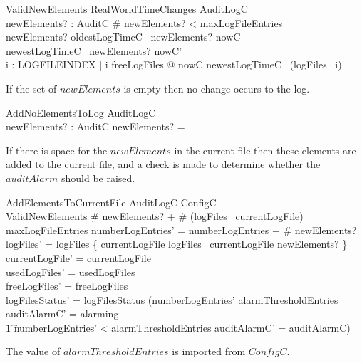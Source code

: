 \begin{schema}{ValidNewElements}
        RealWorldTimeChanges
\also
        AuditLogC
\\      newElements? : \finset AuditC
\where
        \# newElements? < maxLogFileEntries
\\      newElements? \neq \emptyset
\also
        oldestLogTimeC~ newElements? \geq nowC 
\\      newestLogTimeC~ newElements? \leq nowC'
\\      \forall i : LOGFILEINDEX | i \notin freeLogFiles @
        nowC \geq newestLogTimeC~ (logFiles~ i) 
\end{schema}

If the set of $newElements$ is empty then no change occurs to the log.

\begin{schema}{AddNoElementsToLog}
        \Xi AuditLogC
\\      newElements? : \finset AuditC
\where
        newElements? = \emptyset
\end{schema}

If there is space for the $newElements$ in the current file then these
elements are added to the current file, and a check is made to determine whether the
$auditAlarm$ should be raised.

\begin{schema}{AddElementsToCurrentFile}
        \Delta AuditLogC
\also
        ConfigC
\\      ValidNewElements
\where
      \# newElements? + \# (logFiles~ currentLogFile) \leq maxLogFileEntries  
\also
        numberLogEntries' = numberLogEntries + \# newElements? 
\\      logFiles' = logFiles \oplus \{ currentLogFile \mapsto
logFiles~ currentLogFile \cup newElements? \}
\\      currentLogFile' = currentLogFile 
\\      usedLogFiles' = usedLogFiles
\\      freeLogFiles' = freeLogFiles 
\\      logFilesStatus' = logFilesStatus
\also
      (numberLogEntries' \geq alarmThresholdEntries \land auditAlarmC' = alarming
\\ \t1   \lor numberLogEntries' < alarmThresholdEntries \land
auditAlarmC' = auditAlarmC)
\end{schema}
\begin{Zcomment}
\item
The value of $alarmThresholdEntries$ is imported from $ConfigC$. 
\end{Zcomment}

